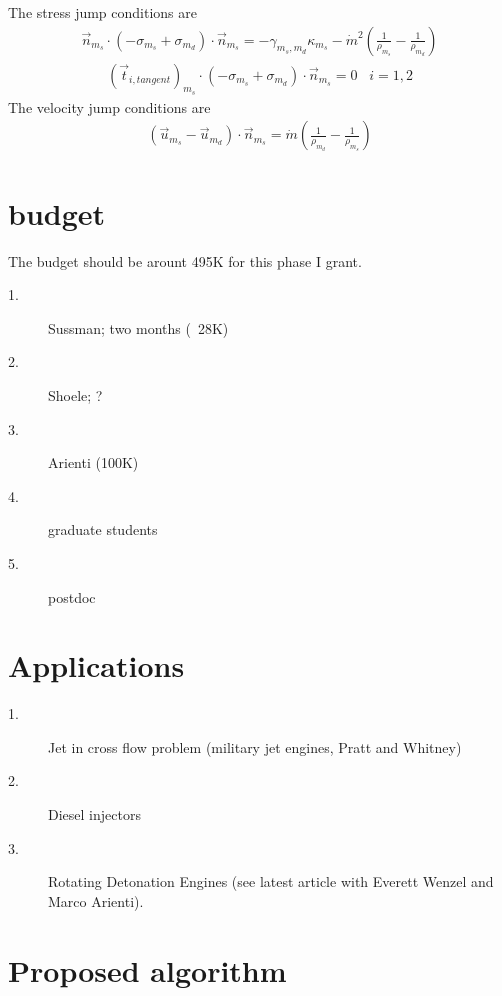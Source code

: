 \documentclass[]{article}
\begin{document}
The stress jump conditions are
\begin{eqnarray}
	\vec{n}_{m_{s}}\cdot
	(-\sigma_{m_{s}}+\sigma_{m_{d}})
	\cdot\vec{n}_{m_{s}}=
	-\gamma_{m_{s},m_{d}}\kappa_{m_{s}}-
	\dot{m}^{2}(
	\frac{1}{\rho_{m_{s}}}-
	\frac{1}{\rho_{m_{d}}})
\end{eqnarray}
\begin{eqnarray}
	(\vec{t}_{i,tangent})_{m_{s}}\cdot
	(-\sigma_{m_{s}}+\sigma_{m_{d}})
	\cdot\vec{n}_{m_{s}}=0 \hspace{10pt} i=1,2
\end{eqnarray}
The velocity jump conditions are
\begin{eqnarray}
	(
	\vec{u}_{m_{s}}-
	\vec{u}_{m_{d}})\cdot\vec{n}_{m_{s}}=
	\dot{m}(
	\frac{1}{\rho_{m_{d}}}-
	\frac{1}{\rho_{m_{s}}})
\end{eqnarray}

\section{budget}

The budget should be arount 495K for this phase I grant.

\begin{description}
	\item[1.] Sussman; two months (~28K)
	\item[2.] Shoele; ?
	\item[3.] Arienti (100K)
        \item[4.] graduate students
	\item[5.] postdoc
\end{description}

\section{Applications}

\begin{description}
	\item[1.] Jet in cross flow problem (military jet engines, Pratt
		and Whitney)
	\item[2.] Diesel injectors
	\item[3.] Rotating Detonation Engines (see latest article with Everett
		Wenzel and Marco Arienti).
\end{description}

\section{Proposed algorithm}
\end{document}
